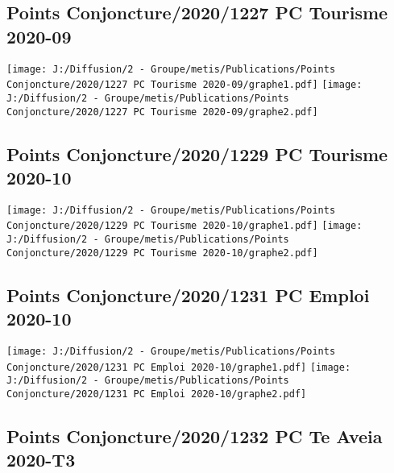 \documentclass[
]{article}
\begin{document}
\hypertarget{points-conjoncture20201227-pc-tourisme-2020-09}{%
\subsection{Points Conjoncture/2020/1227 PC Tourisme
2020-09}\label{points-conjoncture20201227-pc-tourisme-2020-09}}

\texttt{[image: J:/Diffusion/2 - Groupe/metis/Publications/Points Conjoncture/2020/1227 PC Tourisme 2020-09/graphe1.pdf]}
\texttt{[image: J:/Diffusion/2 - Groupe/metis/Publications/Points Conjoncture/2020/1227 PC Tourisme 2020-09/graphe2.pdf]}

\hypertarget{points-conjoncture20201229-pc-tourisme-2020-10}{%
\subsection{Points Conjoncture/2020/1229 PC Tourisme
2020-10}\label{points-conjoncture20201229-pc-tourisme-2020-10}}

\texttt{[image: J:/Diffusion/2 - Groupe/metis/Publications/Points Conjoncture/2020/1229 PC Tourisme 2020-10/graphe1.pdf]}
\texttt{[image: J:/Diffusion/2 - Groupe/metis/Publications/Points Conjoncture/2020/1229 PC Tourisme 2020-10/graphe2.pdf]}

\hypertarget{points-conjoncture20201231-pc-emploi-2020-10}{%
\subsection{Points Conjoncture/2020/1231 PC Emploi
2020-10}\label{points-conjoncture20201231-pc-emploi-2020-10}}

\texttt{[image: J:/Diffusion/2 - Groupe/metis/Publications/Points Conjoncture/2020/1231 PC Emploi 2020-10/graphe1.pdf]}
\texttt{[image: J:/Diffusion/2 - Groupe/metis/Publications/Points Conjoncture/2020/1231 PC Emploi 2020-10/graphe2.pdf]}

\hypertarget{points-conjoncture20201232-pc-te-aveia-2020-t3}{%
\subsection{Points Conjoncture/2020/1232 PC Te Aveia
2020-T3}\label{points-conjoncture20201232-pc-te-aveia-2020-t3}}
\end{document}
